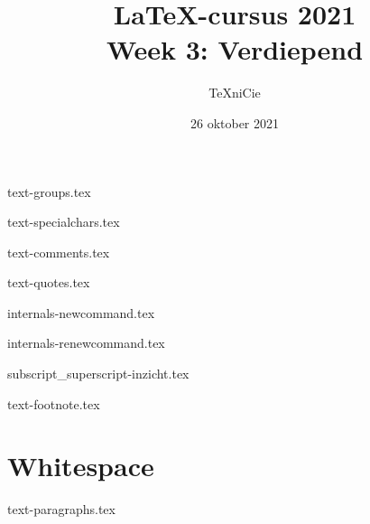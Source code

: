 \documentclass{cursuspresentatie}
\title[LaTeX-cursus 2021 -- Week 3]{%
    \texorpdfstring{\LaTeX{}-cursus 2021\\Week 3: Verdiepend}{%
        Week 3 -- LaTeX-cursus 2021%
    }%
}
\author{\TeX niCie}
\date{26 oktober 2021}
\def\importslide#1#2{%
    {#2}
}
\begin{document}


\begin{frame}
    \titlepage
    \centering
\end{frame}

    

    \clearrecentlist

    \def\assetdir{assets}

    \importslide{text}{text-groups.tex}

    \importslide{text}{text-specialchars.tex}

    \importslide{text}{text-comments.tex}

    \importslide{text}{text-quotes.tex}

    \importslide{internals}{internals-newcommand.tex}

    \importslide{internals}{internals-renewcommand.tex}

    \importslide{math}{subscript_superscript-inzicht.tex}

    \importslide{text}{text-footnote.tex}

    \section{Whitespace}

    \importslide{text}{text-paragraphs.tex}
\end{document}
